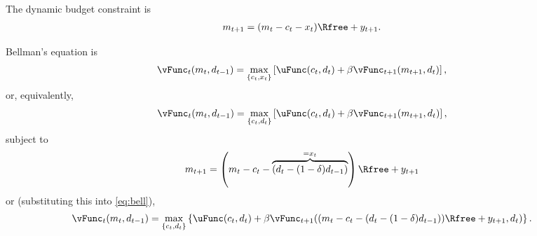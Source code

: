 \documentclass{handout}
\begin{document}
The dynamic budget constraint is 
\begin{equation}\begin{gathered}\begin{aligned}
 {m}_{t+1} & =  ({m}_{t}-c_{t}-{x}_{t})\Rfree + y_{t+1}. \label{eq:xaccum}
\end{aligned}\end{gathered}\end{equation}

Bellman's equation is 
\begin{equation}\begin{gathered}\begin{aligned}
        \vFunc_{t}({m}_{t},d_{t-1}) & =  \max_{\{c_{t},{x}_{t}\}} \left[\uFunc(c_{t},d_{t}) + \beta \vFunc_{t+1}({m}_{t+1},d_{t})\right],
\end{aligned}\end{gathered}\end{equation}
or, equivalently, 
\begin{equation}\begin{gathered}\begin{aligned}
        \vFunc_{t}({m}_{t},d_{t-1}) & =  \max_{\{c_{t},d_{t}\}} \left[\uFunc(c_{t},d_{t}) + \beta \vFunc_{t+1}({m}_{t+1},d_{t})\right], \label{eq:bell}
\end{aligned}\end{gathered}\end{equation}
subject to
\begin{equation}\begin{gathered}\begin{aligned}
        {m}_{t+1} & =  \left({m}_{t}-c_{t}-\overbrace{(d_{t}-(1-\delta)d_{t-1})}^{={x}_{t}}\right)\Rfree+y_{t+1}
\end{aligned}\end{gathered}\end{equation}
or (substituting this into \eqref{eq:bell}),
\begin{equation}\begin{gathered}\begin{aligned}
        \vFunc_{t}({m}_{t},d_{t-1}) & =  \max_{\{c_{t},d_{t}\}} \left\{\uFunc(c_{t},d_{t}) + \beta \vFunc_{t+1}(({m}_{t}-c_{t}-(d_{t}-(1-\delta)d_{t-1}))\Rfree+y_{t+1},d_{t})\right\}. \nonumber
\end{aligned}\end{gathered}\end{equation}
\end{document}
